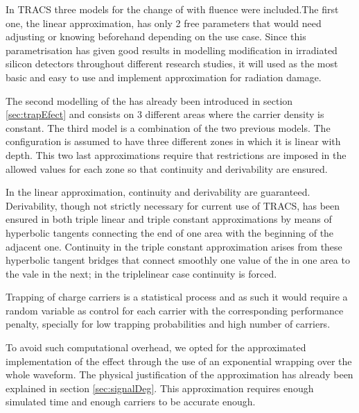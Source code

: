 
In TRACS three models for the change of \neff with fluence were included.The first one, the linear approximation, has only 2 free parameters that would need adjusting or knowing beforehand depending on the use case. Since this parametrisation has given good results in modelling \neff modification in irradiated silicon detectors throughout different research studies, it will used as the most basic and easy to use and implement approximation for radiation damage.

The second modelling of the \neff  has already been introduced in section \ref{sec:trapEfect} and consists on 3 different areas where the carrier density is constant. 
The third model is a combination of the two previous models. The \neff configuration is assumed to have three different zones in which it is linear with depth. This two last approximations require that restrictions are imposed in the allowed values for each zone so that continuity and derivability are ensured.

In the linear approximation, continuity and derivability are guaranteed. Derivability, though not strictly necessary for current use of TRACS, has been ensured in both triple linear and triple constant approximations by means of hyperbolic tangents connecting the end of one area with the beginning of the adjacent one. Continuity in the triple constant approximation arises from these hyperbolic tangent bridges that connect smoothly one value of the \neff in one area to the vale in the next; in the triplelinear case continuity is forced. 

Trapping of charge carriers is a statistical process and as such it would require a random variable as control for each carrier with the corresponding performance penalty, specially for low trapping probabilities and high number of carriers.

To avoid such computational overhead, we opted for the approximated implementation of the effect through the use of an exponential wrapping over the whole waveform. The physical justification of the approximation has already been explained in section \ref{sec:signalDeg}. This approximation requires enough simulated time and enough carriers to be accurate enough.

